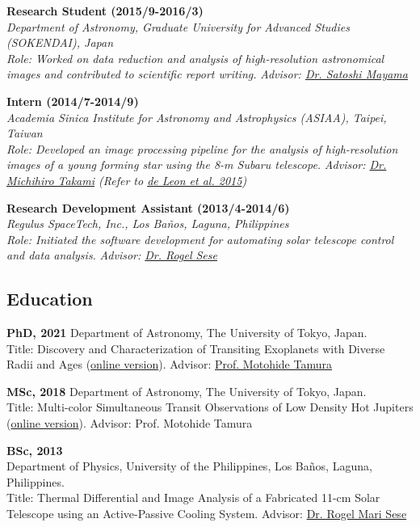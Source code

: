 \documentclass[11pt,letterpaper]{article}
\begin{document}
\begin{list}{}{\cvlist}
    \item 
        \textbf{Research Student (2015/9-2016/3)}\\
        \textit{Department of Astronomy, Graduate University for Advanced Studies (SOKENDAI), Japan}\\
        \textit{Role: Worked on data reduction and analysis of high-resolution astronomical images and contributed to scientific report writing.}
        \textit{Advisor: \href{\mayamaurl}{Dr. Satoshi Mayama}} \\

    \item 
        \textbf{Intern (2014/7-2014/9)}\\
        \textit{Academia Sinica Institute for Astronomy and Astrophysics (ASIAA), Taipei, Taiwan}\\	
        \textit{Role: Developed an image processing pipeline for the analysis of high-resolution images of a young forming star using the 8-m Subaru telescope.}
        \textit{Advisor: \href{takamiurl}{Dr. Michihiro Takami} (Refer to \href{\paperone}{de Leon et al. 2015})} \\

    \item 
        \textbf{Research Development Assistant (2013/4-2014/6)}\\
        \textit{Regulus SpaceTech, Inc., Los Ba\~nos, Laguna, Philippines}\\
        \textit{Role: Initiated the software development for automating solar telescope control and data analysis.}
        \textit{Advisor: \href{\seseurl}{Dr. Rogel Sese}} \\
\end{list}


\subsection{Education}
\begin{list}{}{\cvlist}
    \item
        \textbf{PhD, 2021} Department of Astronomy, The University of Tokyo, Japan.\\
        Title: Discovery and Characterization of Transiting Exoplanets with Diverse Radii and Ages (\href{\phdthesisurl}{online version}).
        Advisor: \href{\tamuraurl}{Prof. Motohide Tamura}
    \item
        \textbf{MSc, 2018} Department of Astronomy, The University of Tokyo, Japan.\\
        Title: Multi-color Simultaneous Transit Observations of Low Density Hot Jupiters (\href{https://github.com/jpdeleon/thesis-master/tree/master}{online version}).
        Advisor: Prof. Motohide Tamura
    \item
        \textbf{BSc, 2013}\\
        Department of Physics, University of the Philippines, Los Ba\~nos, Laguna, Philippines.\\
        Title: Thermal Differential and Image Analysis of a Fabricated 11-cm Solar Telescope using an Active-Passive Cooling System.
        Advisor: \href{\seseurl}{Dr. Rogel Mari Sese}      
\end{list}
\end{document}
